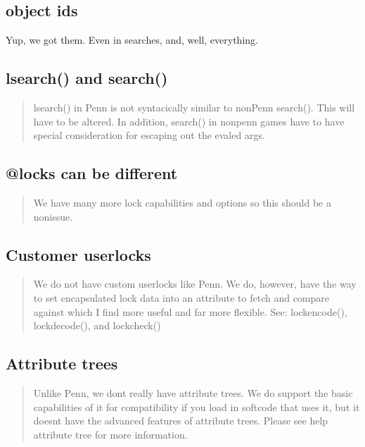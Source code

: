 \documentclass[letterpaper,10pt,english]{sphinxmanual}
\begin{document}
\subsection{object id\textquotesingle{}s}
\label{\detokenize{differences:object-id-s}}
\sphinxAtStartPar
Yup, we got them.  Even in searches, and, well, everything.


\subsection{lsearch() and search()}
\label{\detokenize{differences:lsearch-and-search}}\begin{quote}

\sphinxAtStartPar
lsearch() in Penn is not syntacically similar to non\sphinxhyphen{}Penn search().
This will have to be altered.  In addition, search() in non\sphinxhyphen{}penn games
have to have special consideration for escaping out the evaled args.
\end{quote}


\subsection{@locks can be different}
\label{\detokenize{differences:locks-can-be-different}}\begin{quote}

\sphinxAtStartPar
We have many more lock capabilities and options
so this should be a non\sphinxhyphen{}issue.
\end{quote}


\subsection{Customer user\sphinxhyphen{}locks}
\label{\detokenize{differences:customer-user-locks}}\begin{quote}

\sphinxAtStartPar
We do not have custom user\sphinxhyphen{}locks like Penn.  We do, however, have the way
to set encapsulated lock data into an attribute to fetch and compare
against which I find more useful and far more flexible.
See: lockencode(), lockdecode(), and lockcheck()
\end{quote}


\subsection{Attribute trees}
\label{\detokenize{differences:attribute-trees}}\begin{quote}

\sphinxAtStartPar
Unlike Penn, we don\textquotesingle{}t really have attribute trees.  We do support the
basic capabilities of it for compatibility if you load in softcode that
uses it, but it doesn\textquotesingle{}t have the advanced features of attribute trees.
Please see \textquotesingle{}help attribute tree\textquotesingle{} for more information.
\end{quote}
\end{document}
